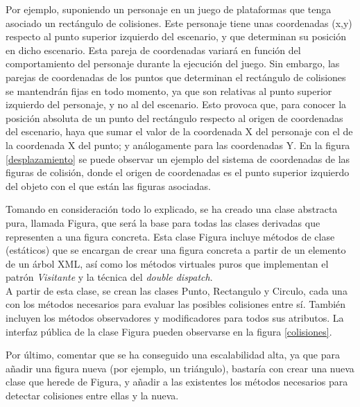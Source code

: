 Por ejemplo, suponiendo un personaje en un juego de plataformas que tenga asociado un rectángulo de colisiones. Este personaje tiene unas coordenadas (x,y) respecto al punto superior izquierdo del escenario, y que determinan su posición en dicho escenario. Esta pareja de coordenadas variará en función del comportamiento del personaje durante la ejecución del juego. Sin embargo, las parejas de coordenadas de los puntos que determinan el rectángulo de colisiones se mantendrán fijas en todo momento, ya que son relativas al punto superior izquierdo del personaje, y no al del escenario. Esto provoca que, para conocer la posición absoluta de un punto del rectángulo respecto al origen de coordenadas del escenario, haya que sumar el valor de la coordenada X del personaje con el de la coordenada X del punto; y análogamente para las coordenadas Y. En la figura \ref{desplazamiento} se puede observar un ejemplo del sistema de coordenadas de las figuras de colisión, donde el origen de coordenadas es el punto superior izquierdo del objeto con el que están las figuras asociadas.\\


Tomando en consideración todo lo explicado, se ha creado una clase abstracta pura, llamada Figura, que será la base para todas las clases derivadas que representen a una figura concreta. Esta clase Figura incluye métodos de clase (estáticos) que se encargan de crear una figura concreta a partir de un elemento de un árbol XML, así como los métodos virtuales puros que implementan el patrón \emph{Visitante} y la técnica del \emph{double dispatch}.\\

A partir de esta clase, se crean las clases Punto, Rectangulo y Circulo, cada una con los métodos necesarios para evaluar las posibles colisiones entre sí. También incluyen los métodos observadores y modificadores para todos sus atributos. La interfaz pública de la clase Figura pueden observarse en la figura \ref{colisiones}.\\


Por último, comentar que se ha conseguido una escalabilidad alta, ya que para añadir una figura nueva (por ejemplo, un triángulo), bastaría con crear una nueva clase que herede de Figura, y añadir a las existentes los métodos necesarios para detectar colisiones entre ellas y la nueva.

